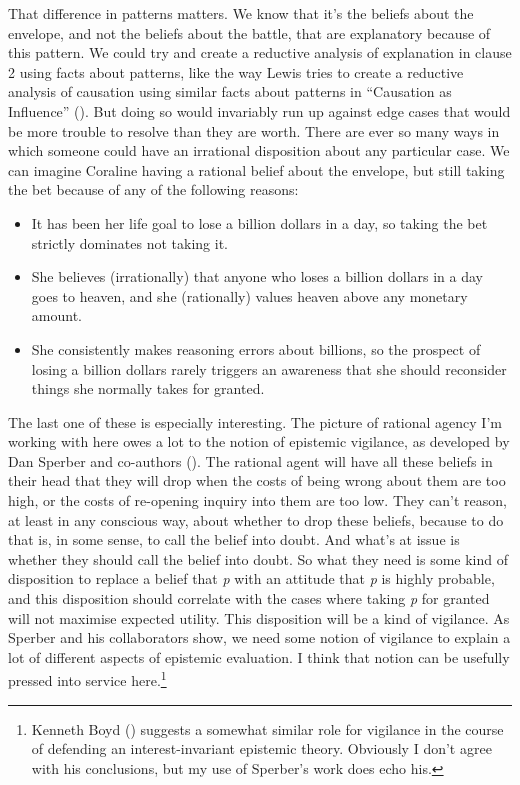 \documentclass[
  10pt,
  letterpaper,
  twoside]{scrbook}
\providecommand{\tightlist}{%
  \setlength{\itemsep}{0pt}\setlength{\parskip}{0pt}}\usepackage{longtable,booktabs,array}
\begin{document}
That difference in patterns matters. We know that it's the beliefs about
the envelope, and not the beliefs about the battle, that are explanatory
because of this pattern. We could try and create a reductive analysis of
explanation in clause 2 using facts about patterns, like the way Lewis
tries to create a reductive analysis of causation using similar facts
about patterns in ``Causation as Influence''
(). But doing so would invariably
run up against edge cases that would be more trouble to resolve than
they are worth. There are ever so many ways in which someone could have
an irrational disposition about any particular case. We can imagine
Coraline having a rational belief about the envelope, but still taking
the bet because of any of the following reasons:

\begin{itemize}
\tightlist
\item
  It has been her life goal to lose a billion dollars in a day, so
  taking the bet strictly dominates not taking it.
\item
  She believes (irrationally) that anyone who loses a billion dollars in
  a day goes to heaven, and she (rationally) values heaven above any
  monetary amount.
\item
  She consistently makes reasoning errors about billions, so the
  prospect of losing a billion dollars rarely triggers an awareness that
  she should reconsider things she normally takes for granted.
\end{itemize}

The last one of these is especially interesting. The picture of rational
agency I'm working with here owes a lot to the notion of epistemic
vigilance, as developed by Dan Sperber and co-authors
(). The rational
agent will have all these beliefs in their head that they will drop when
the costs of being wrong about them are too high, or the costs of
re-opening inquiry into them are too low. They can't reason, at least in
any conscious way, about whether to drop these beliefs, because to do
that is, in some sense, to call the belief into doubt. And what's at
issue is whether they should call the belief into doubt. So what they
need is some kind of disposition to replace a belief that \emph{p} with
an attitude that \emph{p} is highly probable, and this disposition
should correlate with the cases where taking \emph{p} for granted will
not maximise expected utility. This disposition will be a kind of
vigilance. As Sperber and his collaborators show, we need some notion of
vigilance to explain a lot of different aspects of epistemic evaluation.
I think that notion can be usefully pressed into service
here.\footnote{Kenneth Boyd () suggests a
  somewhat similar role for vigilance in the course of defending an
  interest-invariant epistemic theory. Obviously I don't agree with his
  conclusions, but my use of Sperber's work does echo his.}
\end{document}
